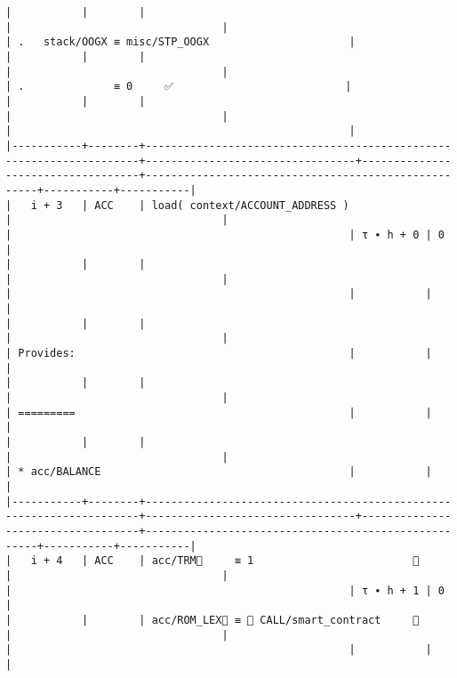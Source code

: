 \documentclass[varwidth=\maxdimen,margin=0.5cm,multi={verbatim}]{standalone}
\begin{document}
\begin{verbatim}
|           |        |                                                                     |                                 |                                   | .   stack/OOGX ≡ misc/STP_OOGX                      |
|           |        |                                                                     |                                 |                                   | .              ≡ 0     ✅                           |
|           |        |                                                                     |                                 |                                   |                                                     |
|-----------+--------+---------------------------------------------------------------------+---------------------------------+-----------------------------------+-----------------------------------------------------+-----------+-----------|
|   i + 3   | ACC    | load( context/ACCOUNT_ADDRESS )                                     |                                 |                                   |                                                     | τ ∙ h + 0 | 0         |
|           |        |                                                                     |                                 |                                   |                                                     |           |           |
|           |        |                                                                     |                                 |                                   | Provides:                                           |           |           |
|           |        |                                                                     |                                 |                                   | =========                                           |           |           |
|           |        |                                                                     |                                 |                                   | * acc/BALANCE                                       |           |           |
|-----------+--------+---------------------------------------------------------------------+---------------------------------+-----------------------------------+-----------------------------------------------------+-----------+-----------|
|   i + 4   | ACC    | acc/TRM🚩     ≡ 1                         👋                        |                                 |                                   |                                                     | τ ∙ h + 1 | 0         |
|           |        | acc/ROM_LEX🚩 ≡  CALL/smart_contract     👋                        |                                 |                                   |                                                     |           |           |

\end{verbatim}
\end{document}
